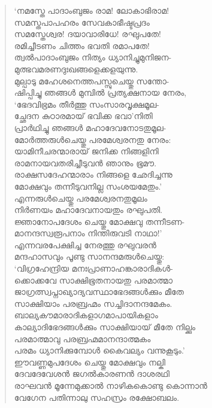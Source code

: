 \begin{verse}
‘നമസ്തേ പാദാംബുജം രാമ! ലോകാഭിരാമ!\\
സമസ്തപാപഹരം സേവകാഭീഷ്ടപ്രദം\\
സമസ്തേശ്വര! ദയാവാരിധേ! രഘുപതേ!\\
രമിച്ചീടണം ചിത്തം ഭവതി രമാപതേ!\\
ത്വല്‍പാദാംബുജം നിത്യം ധ്യാനിച്ചുമുനിജന-\\
മുത്ഭവമരണദുഃഖങ്ങളെക്കളയുന്നു.\\
മുല്പാടു മഹേശനെത്തപസ്സുചെയ്തു സന്തോ-\\
ഷിപ്പിച്ചു ഞങ്ങള്‍ മുമ്പില്‍ പ്രത്യക്ഷനായ നേരം,\\
‘ഭേദവിഭ്രമം തീര്‍ത്തു സംസാരവൃക്ഷമൂല-\\
ച്ഛേദന കുഠാരമായ് ഭവിക്ക ഭവാ’നിതി\\
പ്രാര്‍ഥിച്ചു ഞങ്ങള്‍ മഹാദേവനോടതുമൂല-\\
മോര്‍ത്തരുള്‍ചെയ്തു പരമേശ്വരനതു നേരം:\\
യാമിനീചരന്മാരായ് ജനിക്ക നിങ്ങളിനി\\
രാമനായവതരിച്ചീടുവന്‍ ഞാനും ഭൂമൗ.\\
രാക്ഷസദേഹന്മാരാം നിങ്ങളെ ഛേദിച്ചന്നു\\
മോക്ഷവും തന്നീടുവനില്ല സംശയമേതും.’\\
എന്നരുള്‍ചെയ്തു പരമേശ്വരനതുമൂലം\\
നിര്‍ണയം മഹാദേവനായതും രഘുപതി.\\
ജ്ഞാനോപദേശം ചെയ്തു മോക്ഷവു തന്നീടണ-\\
മാനന്ദസ്വരൂപനാം നിന്തിരുവടി നാഥാ!’\\
എന്നവരപേക്ഷിച്ച നേരത്തു രഘുവരന്‍\\
മന്ദഹാസവും പൂണ്ടു സാനന്ദമരുള്‍ചെയ്തു:\\
‘വിഗ്രഹേന്ദ്രിയ മനഃപ്രാണാഹങ്കാരാദികള്‍-\\
ക്കൊക്കവേ സാക്ഷിഭൂതനായതു പരമാത്മാ\\
ജാഗ്രത്സ്വപ്നാഖ്യാദ്യവസ്ഥാഭേദങ്ങള്‍ക്കും മീതേ\\
സാക്ഷിയാം പരബ്രഹ്മം സച്ചിദാനന്ദമേകം.\\
ബാല്യകൗമാരാദികളാഗമാപായികളാം\\
കാല്യാദിഭേദങ്ങള്‍ക്കും സാക്ഷിയായ് മീതേ നില്ക്കും\\
പരമാത്മാവു പരബ്രഹ്മമാനന്ദാത്മകം\\
പരമം ധ്യാനിക്കുമ്പോള്‍ കൈവല്യം വന്നുകൂടും.’\\
ഈവണ്ണമുപദേശം ചെയ്തു മോക്ഷവും നല്കി\\
ദേവദേവേശന്‍ ജഗല്‍കാരണന്‍ ദാശരഥി\\
രാഘവന്‍ മൂന്നേമുക്കാല്‍ നാഴികകൊണ്ടു കൊന്നാന്‍\\
വേഗേന പതിന്നാലു സഹസ്രം രക്ഷോബലം.\\

\end{verse}
